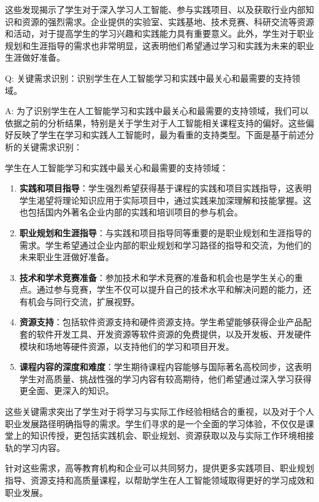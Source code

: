这些发现揭示了学生对于深入学习人工智能、参与实践项目、以及获取行业内部知识和资源的强烈需求。企业提供的实验室、实践基地、技术竞赛、科研交流等资源和活动，对于提高学生的学习兴趣和实践能力具有重要意义。此外，学生对于职业规划和生涯指导的需求也非常明显，这表明他们希望通过学习和实践为未来的职业生涯做好准备。

Q:
  关键需求识别：识别学生在人工智能学习和实践中最关心和最需要的支持领域。

A:
为了识别学生在人工智能学习和实践中最关心和最需要的支持领域，我们可以依据之前的分析结果，特别是关于学生对于人工智能相关课程支持的偏好。这些偏好反映了学生在学习和实践人工智能时，最为看重的支持类型。下面是基于前述分析的关键需求识别：

学生在人工智能学习和实践中最关心和最需要的支持领域：
\begin{enumerate}
\item \textbf{实践和项目指导}：学生强烈希望获得基于课程的实践和项目实践指导，这表明学生渴望将理论知识应用于实际项目中，通过实践来加深理解和技能掌握。这也包括国内外著名企业内部的实践和培训项目的参与机会。

\item \textbf{职业规划和生涯指导}：与实践和项目指导同等重要的是职业规划和生涯指导的需求。学生希望通过企业内部的职业规划和学习路径的指导和交流，为他们的未来职业生涯做好准备。

\item \textbf{技术和学术竞赛准备}：参加技术和学术竞赛的准备和机会也是学生关心的重点。通过参与竞赛，学生不仅可以提升自己的技术水平和解决问题的能力，还有机会与同行交流，扩展视野。

\item \textbf{资源支持}：包括软件资源支持和硬件资源支持。学生希望能够获得企业产品配套的软件开发工具、开发资源等软件资源的免费提供，以及开发板、开发硬件模块和场地等硬件资源，以支持他们的学习和项目开发。

\item \textbf{课程内容的深度和难度}：学生期待课程内容能够与国际著名高校同步，这表明学生对高质量、挑战性强的学习内容有较高期待，他们希望通过深入学习获得更全面、更深入的知识。
\end{enumerate}

这些关键需求突出了学生对于将学习与实际工作经验相结合的重视，以及对于个人职业发展路径明确指导的需求。学生们寻求的是一个全面的学习体验，不仅仅是课堂上的知识传授，更包括实践机会、职业规划、资源获取以及与实际工作环境相接轨的学习内容。

针对这些需求，高等教育机构和企业可以共同努力，提供更多实践项目、职业规划指导、资源支持和高质量课程，以帮助学生在人工智能领域取得更好的学习成效和职业发展。

